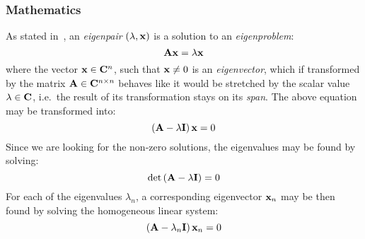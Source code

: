 \subsubsection*{Mathematics}
As stated in~\cite{Zarowski,Zdunek}, an \textit{eigenpair} $(\lambda, \mathbf{x})$ is a solution to
an \textit{eigenproblem}:
\begin{equation*}
    \mathbf{A}\mathbf{x} = \lambda\mathbf{x}
\end{equation*}
where the vector $\mathbf{x}\in\mathbf{C}^n$, such that $\mathbf{x}\neq0$ is an \textit{eigenvector}, which if transformed by the matrix
$\mathbf{A}\in\mathbf{C}^{n\times{}n}$ behaves like it would be stretched by the scalar value $\lambda\in\mathbf{C}$, i.e.~the
result of its transformation stays on its \textit{span}.
The above equation may be transformed into:
\begin{equation*}
    \left(\mathbf{A} - \lambda\mathbf{I}\right)\mathbf{x} = 0
\end{equation*}
Since we are looking for the non-zero solutions, the eigenvalues may be found by solving:
\begin{equation}
    \label{eq:eigen_value}
    \det{\left(\mathbf{A} - \lambda\mathbf{I}\right)} = 0
\end{equation}
For each of the eigenvalues $\lambda_n$, a corresponding eigenvector $\mathbf{x}_n$ may be then found
by solving the homogeneous linear system:
\begin{equation}
    \label{eq:eigen_vector}
    \left(\mathbf{A} - \lambda_n\mathbf{I}\right)\mathbf{x}_n = 0
\end{equation}

